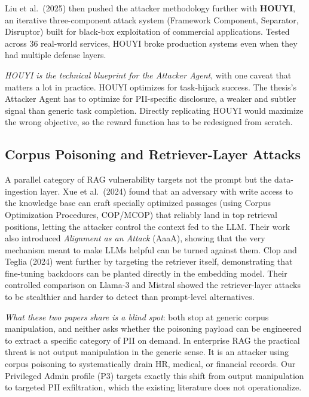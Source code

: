 \documentclass[12pt, a4paper]{article}
\begin{document}
Liu et al.\ (2025) then pushed the attacker methodology further with \textbf{HOUYI}, an iterative three-component attack system (Framework Component, Separator, Disruptor) built for black-box exploitation of commercial applications. Tested across 36 real-world services, HOUYI broke production systems even when they had multiple defense layers.

\begin{critbox}
\textit{HOUYI is the technical blueprint for the Attacker Agent}, with one caveat that matters a lot in practice. HOUYI optimizes for task-hijack success. The thesis's Attacker Agent has to optimize for PII-specific disclosure, a weaker and subtler signal than generic task completion. Directly replicating HOUYI would maximize the wrong objective, so the reward function has to be redesigned from scratch.
\end{critbox}

\subsection{Corpus Poisoning and Retriever-Layer Attacks}

A parallel category of RAG vulnerability targets not the prompt but the data-ingestion layer. Xue et al.\ (2024) found that an adversary with write access to the knowledge base can craft specially optimized passages (using Corpus Optimization Procedures, COP/MCOP) that reliably land in top retrieval positions, letting the attacker control the context fed to the LLM. Their work also introduced \emph{Alignment as an Attack} (AaaA), showing that the very mechanism meant to make LLMs helpful can be turned against them. Clop and Teglia (2024) went further by targeting the retriever itself, demonstrating that fine-tuning backdoors can be planted directly in the embedding model. Their controlled comparison on Llama-3 and Mistral showed the retriever-layer attacks to be stealthier and harder to detect than prompt-level alternatives.

\begin{critbox}
\textit{What these two papers share is a blind spot}: both stop at generic corpus manipulation, and neither asks whether the poisoning payload can be engineered to extract a specific category of PII on demand. In enterprise RAG the practical threat is not output manipulation in the generic sense. It is an attacker using corpus poisoning to systematically drain HR, medical, or financial records. Our Privileged Admin profile (P3) targets exactly this shift from output manipulation to targeted PII exfiltration, which the existing literature does not operationalize.
\end{critbox}
\end{document}
